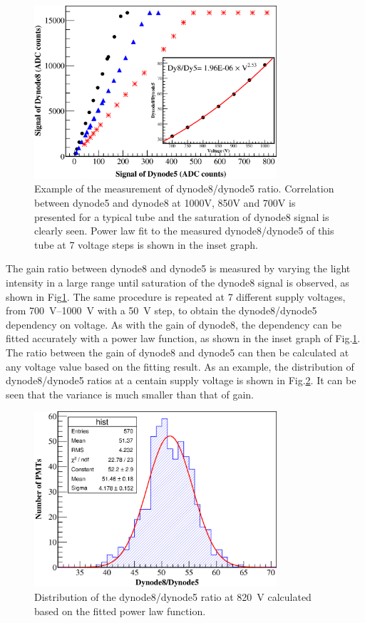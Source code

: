 \documentclass[review, times]{elsarticle}
\begin{document}
\begin{figure}
 \centering
 \includegraphics[width=90mm]{FIG10}
\caption{Example of the measurement of dynode8/dynode5 ratio.
Correlation between dynode5 and dynode8 at 1000V, 850V and 700V is presented for a typical tube and the saturation of dynode8 signal is clearly seen.
Power law fit to the measured dynode8/dynode5 of this tube at 7 voltage steps is shown in the inset graph.
}
\label{fig:FIG10}
\end{figure} 

The gain ratio between dynode8 and dynode5 is measured by varying the light intensity in a large range until saturation of the dynode8 signal is observed, as shown in Fig\ref{fig:FIG10}.
The same procedure is repeated at 7 different supply voltages, from \SIrange{700}{1000}{\volt} with a \SI{50}{\volt} step, to obtain the dynode8/dynode5 dependency on voltage.
As with the gain of dynode8, the dependency can be fitted accurately with a power law function, as shown in the inset graph of Fig.\ref{fig:FIG10}.
The ratio between the gain of dynode8 and dynode5 can then be calculated at any voltage value based on the fitting result.
As an example, the distribution of dynode8/dynode5 ratios at a centain supply voltage is shown in Fig.\ref{fig:FIG11}.
It can be seen that the variance is much smaller than that of gain.

\begin{figure}
 \centering
 \includegraphics[width=90mm]{FIG11}
\caption{Distribution of the dynode8/dynode5 ratio at \SI{820}{\volt} calculated based on the fitted power law function.}
\label{fig:FIG11}
\end{figure} 
\end{document}
